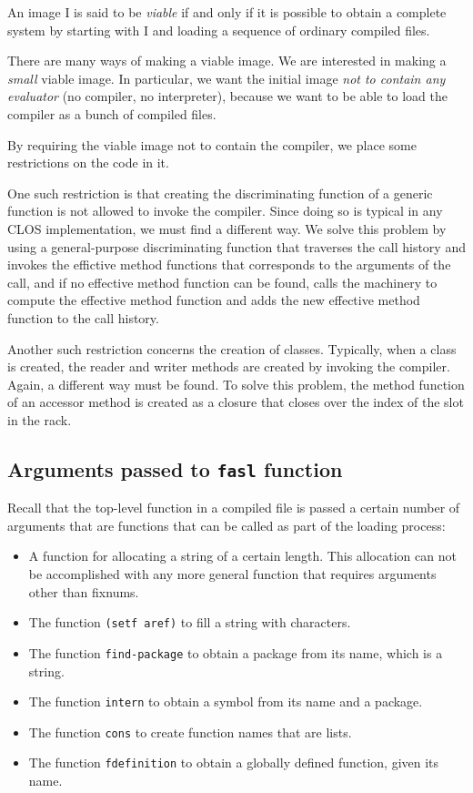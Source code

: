 An image I is said to be \emph{viable} if and only if it is possible
to obtain a complete \commonlisp{} system by starting with I and loading a
sequence of ordinary compiled files.

There are many ways of making a viable image.  We are interested in
making a \emph{small} viable image.  In particular, we want the
initial image \emph{not to contain any evaluator} (no compiler, no
interpreter), because we want to be able to load the compiler as a
bunch of compiled files.

By requiring the viable image not to contain the compiler, we place
some restrictions on the code in it.  

One such restriction is that creating the discriminating function of a
generic function is not allowed to invoke the compiler.  Since doing
so is typical in any CLOS implementation, we must find a different
way.  We solve this problem by using a general-purpose discriminating
function that traverses the call history and invokes the effictive
method functions that corresponds to the arguments of the call, and if
no effective method function can be found, calls the machinery to
compute the effective method function and adds the new effective
method function to the call history.

Another such restriction concerns the creation of classes.  Typically,
when a class is created, the reader and writer methods are created by
invoking the compiler.  Again, a different way must be found.  To solve
this problem, the method function of an accessor method is created
as a closure that closes over the index of the slot in the rack.

\subsection{Arguments passed to \texttt{fasl} function}

Recall that the top-level function in a compiled file is passed a
certain number of arguments that are functions that can be called as
part of the loading process:

\begin{itemize}
\item A function for allocating a string of a certain length.  This
  allocation can not be accomplished with any more general function
  that requires arguments other than fixnums.
\item The function \texttt{(setf aref)} to fill a string with
  characters.
\item The function \texttt{find-package} to obtain a package from its
  name, which is a string.
\item The function \texttt{intern} to obtain a symbol from its name
  and a package.
\item The function \texttt{cons} to create function names that are
  lists.
\item The function \texttt{fdefinition} to obtain a globally defined
  function, given its name.
\end{itemize}

